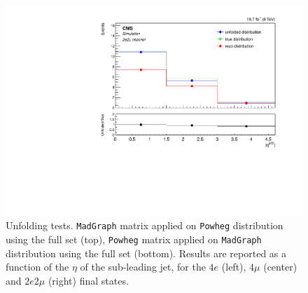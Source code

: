 \begin{figure}[hbtp]
\begin{center}
    \includegraphics[width=0.8\cmsFigWidth]{Figures/Unfolding/MCTests/EtaJet2_ZZTo2e2m_PowMatrix_MadDistr_FullSample_fr}  
 \caption{Unfolding tests. \texttt{MadGraph} matrix applied on \texttt{Powheg} distribution using the full set (top), \texttt{Powheg} matrix applied on \texttt{MadGraph} distribution using the full set (bottom). Results are reported as a function of  the $\eta$ of the sub-leading jet, for the $4e$ (left), $4\mu$ (center) and $2e2\mu$ (right) final states.}
    \label{fig:MCtest_EtaJet22}
  \end{center}
\end{figure}
\clearpage

